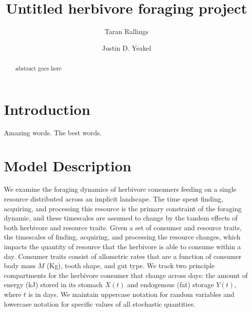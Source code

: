 \documentclass[onecolumn,preprintnumbers,amsmath,amssymb,superscriptaddress]{revtex4}
\begin{document}
\author{Taran Rallings} 

\author{Justin D. Yeakel} 


\title{Untitled herbivore foraging project}



\begin{abstract}
abstract goes here
\end{abstract}

\maketitle

\section*{Introduction}

Amazing words. The best words.



\section*{Model Description}

We examine the foraging dynamics of herbivore consumers feeding on a single resource distributed across an implicit landscape.
The time spent finding, acquiring, and processing this resource is the primary constraint of the foraging dynamic, and these timescales are assumed to change by the tandem effects of both herbivore and resource traits.
Given a set of consumer and resource traits, the timescales of finding, acquiring, and processing the resource changes, which impacts the quantity of resource that the herbivore is able to consume within a day.
Consumer traits consist of allometric rates that are a function of consumer body mass $M$ (Kg), tooth shape, and gut type.
We track two principle compartments for the herbivore consumer that change across days: the amount of energy (kJ) stored in its stomach $X(t)$ and endogenous (fat) storage $Y(t)$, where $t$ is in days.
We maintain uppercase notation for random variables and lowercase notation for specific values of all stochastic quantities.
\end{document}

